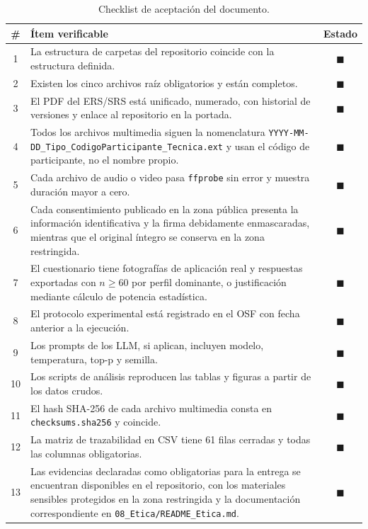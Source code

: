 \documentclass[journal,onecolumn]{IEEEtran}
\begin{document}
	\begin{table}[H]
		\centering
	\caption{Checklist de aceptación del documento.}
		\label{tab:checklist}
		\small
		\begin{tabularx}{\textwidth}{@{}c X c@{}}
			\toprule
			\textbf{\#} & \textbf{Ítem verificable} & \textbf{Estado} \\
			\midrule
			1 & La estructura de carpetas del repositorio coincide con la estructura definida. & $\blacksquare$ \\
			2 & Existen los cinco archivos raíz obligatorios y están completos. & $\blacksquare$ \\
			3 & El PDF del ERS/SRS está unificado, numerado, con historial de versiones y enlace al repositorio en la portada. & $\blacksquare$ \\
			4 & Todos los archivos multimedia siguen la nomenclatura \texttt{YYYY-MM-DD\_Tipo\_CodigoParticipante\_Tecnica.ext} y usan el código de participante, no el nombre propio. & $\blacksquare$ \\
			5 & Cada archivo de audio o video pasa \texttt{ffprobe} sin error y muestra duración mayor a cero. & $\blacksquare$ \\
			6 & Cada consentimiento publicado en la zona pública presenta la información identificativa y la firma debidamente enmascaradas, mientras que el original íntegro se conserva en la zona restringida. & $\blacksquare$ \\
			7 & El cuestionario tiene fotografías de aplicación real y respuestas exportadas con $n \geq 60$ por perfil dominante, o justificación mediante cálculo de potencia estadística. & $\blacksquare$ \\
			8 & El protocolo experimental está registrado en el OSF con fecha anterior a la ejecución. & $\blacksquare$ \\
			9 & Los prompts de los LLM, si aplican, incluyen modelo, temperatura, top-p y semilla. & $\blacksquare$ \\
			10 & Los scripts de análisis reproducen las tablas y figuras a partir de los datos crudos. & $\blacksquare$ \\
			11 & El hash SHA-256 de cada archivo multimedia consta en \texttt{checksums.sha256} y coincide. & $\blacksquare$\\
			12 & La matriz de trazabilidad en CSV tiene 61 filas cerradas y todas las columnas obligatorias. &$\blacksquare$ \\
			13 & Las evidencias declaradas como obligatorias para la entrega se encuentran disponibles en el repositorio, con los materiales sensibles protegidos en la zona restringida y la documentación correspondiente en \texttt{08\_Etica/README\_Etica.md}. & $\blacksquare$ \\

\end{tabularx}
\end{table}
\end{document}
